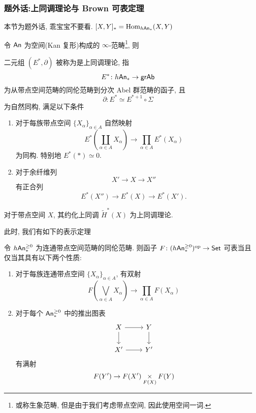 \subsubsection{题外话:上同调理论与 Brown 可表定理}
\begin{remark}
    本节为题外话, 乖宝宝不要看. $[X,Y]_* = \operatorname{Hom}_{h\mathsf{An}_*}(X,Y)$
\end{remark}
令 $\mathsf{An}$ 为空间(Kan 复形)构成的 $\infty$-范畴\footnote{或称生象范畴, 但是由于我们考虑带点空间, 因此使用空间一词.}, 则
\begin{definition}
    二元组 $(E^*,\partial)$ 被称为是上同调理论, 指
    \[
    E^* \colon h\mathsf{An}_* \to \mathsf{grAb}
    \]
    为从带点空间范畴的同伦范畴到分次 Abel 群范畴的函子, 且
    \[
    \partial \colon E^* \simeq E^{*+1}\circ \Sigma
    \]
    为自然同构, 满足以下条件
    \begin{enumerate}
        \item 对于每族带点空间 $\{X_{\alpha}\}_{\alpha \in A}$ 自然映射
        \[
        E^*(\coprod_{\alpha \in A}X_{\alpha}) \to \prod_{\alpha \in A}E^*(X_{\alpha})
        \]
        为同构. 特别地 $E^*(*) \simeq 0$.
        \item 对于余纤维列
        \[
        X' \to X \to X''
        \]
        有正合列
        \[
        E^*(X'') \to E^*(X) \to E^*(X').
        \]
    \end{enumerate}
\end{definition}
\begin{example}
    对于带点空间 $X$, 其约化上同调 $\tilde{H}^*(X)$ 为上同调理论.
\end{example}
此时, 我们有如下的表示定理
\begin{theorem}\label{定理-Brown 可表}
    令 $h\mathsf{An}_*^{\geq 0}$ 为连通带点空间范畴的同伦范畴. 则函子 $F \colon (h\mathsf{An}_*^{\geq 0})^{\operatorname{op}}\to \mathsf{Set}$ 可表当且仅当其具有以下两个性质:
    \begin{enumerate}
        \item 对于每族连通带点空间 $\{X_{\alpha}\}_{\alpha \in A}$, 有双射
        \[
        F(\bigvee_{\alpha \in A}X_{\alpha}) \to \prod_{\alpha \in A}F(X_{\alpha})
        \]
        \item 对于每个 $\mathsf{An}_*^{\geq 0}$ 中的推出图表
        \[\begin{tikzcd}
	X & Y \\
	{X'} & {Y'}
	\arrow[from=1-1, to=1-2]
	\arrow[from=1-1, to=2-1]
	\arrow[from=1-2, to=2-2]
	\arrow[from=2-1, to=2-2]
        \end{tikzcd}\]
        有满射
        \[
        F(Y') \to F(X') \underset{F(X)}{\times} F(Y)
        \]
    \end{enumerate}
\end{theorem}
